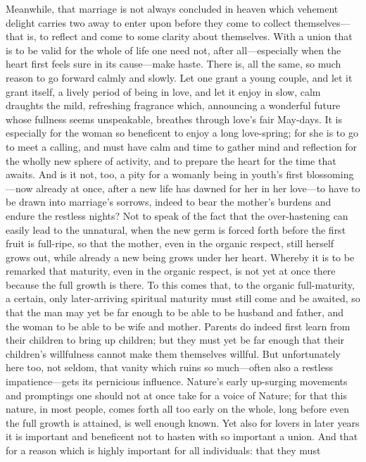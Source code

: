 \documentclass[12pt,a4paper]{book}
\begin{document}
Meanwhile, that marriage is not always concluded in heaven which vehement
delight carries two away to enter upon before they come to collect
themselves---that is, to reflect and come to some clarity about themselves.
With a union that is to be valid for the whole of life one need not, after
all---especially when the heart first feels sure in its cause---make haste.
There is, all the same, so much reason to go forward calmly and slowly. Let
one grant a young couple, and let it grant itself, a lively period of being
in love, and let it enjoy in slow, calm draughts the mild, refreshing
fragrance which, announcing a wonderful future whose fullness seems
unspeakable, breathes through love's fair May-days. It is especially for
the woman so beneficent to enjoy a long love-spring; for she is to go to
meet a calling, and must have calm and time to gather mind and reflection
for the wholly new sphere of activity, and to prepare the heart for the
time that awaits. And is it not, too, a pity for a womanly being in youth's
first blossoming---now already at once, after a new life has dawned for her
in her love---to have to be drawn into marriage's sorrows, indeed to bear
the mother's burdens and endure the restless nights? Not to speak of the
fact that the over-hastening can easily lead to the unnatural, when the new
germ is forced forth before the first fruit is full-ripe, so that the
mother, even in the organic respect, still herself grows out, while already
a new being grows under her heart. Whereby it is to be remarked that
maturity, even in the organic respect, is not yet at once there because the
full growth is there. To this comes that, to the organic full-maturity, a
certain, only later-arriving spiritual maturity must still come and be
awaited, so that the man may yet be far enough to be able to be husband and
father, and the woman to be able to be wife and mother. Parents do indeed
first learn from their children to bring up children; but they must yet be
far enough that their children's willfulness cannot make them themselves
willful. But unfortunately here too, not seldom, that vanity which ruins so
much---often also a restless impatience---gets its pernicious influence.
Nature's early up-surging movements and promptings one should not at once
take for a voice of Nature; for that this nature, in most people, comes
forth all too early on the whole, long before even the full growth is
attained, is well enough known. Yet also for lovers in later years it is
important and beneficent not to hasten with so important a union. And that
for a reason which is highly important for all individuals: that they must
\end{document}
